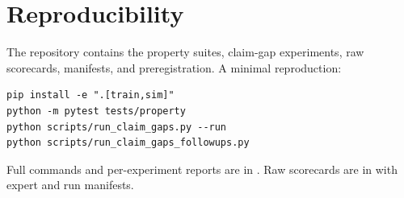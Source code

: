 \documentclass[10pt]{article}
\begin{document}
\appendix

\section{Reproducibility}
\label{app:repro}

The repository contains the property suites, claim-gap experiments, raw
scorecards, manifests, and preregistration. A minimal reproduction:

\begin{verbatim}
pip install -e ".[train,sim]"
python -m pytest tests/property
python scripts/run_claim_gaps.py --run
python scripts/run_claim_gaps_followups.py
\end{verbatim}

Full commands and per-experiment reports are in
. Raw scorecards are in
 with expert and run manifests.

\small


\end{document}
